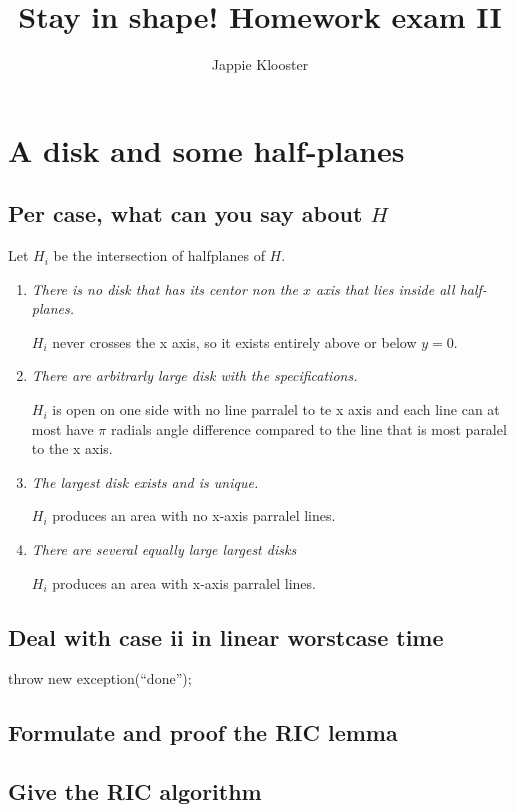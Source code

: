 \documentclass{article}
\begin{document}
\author{Jappie Klooster}
\title{Stay in shape! Homework exam II}
\maketitle
\section{A disk and some half-planes}
\subsection{Per case, what can you say about $H$}
Let $H_i$ be the intersection of halfplanes of $H$.
\begin{enumerate}[i]
	\item \emph{There is no disk that has its centor non the $x$ axis
			that lies inside all half-planes.}

		$H_i$ never crosses the x axis,
		so it exists entirely above or below $y=0$.

	\item \emph{There are arbitrarly large disk with the specifications.}

		$H_i$ is open on one side with no line parralel to te x axis and
		each line can at most have $\pi$ radials angle difference
		compared to the line that is most paralel to the x axis.

	\item \emph{The largest disk exists and is unique.}

		$H_i$ produces an area with no x-axis parralel lines.

	\item \emph{There are several equally large largest disks}

		$H_i$ produces an area with x-axis parralel lines.

\end{enumerate}

\subsection{Deal with case ii in linear worstcase time}
throw new exception(``done'');
\subsection{Formulate and proof the RIC lemma}
\subsection{Give the RIC algorithm}
\end{document}
